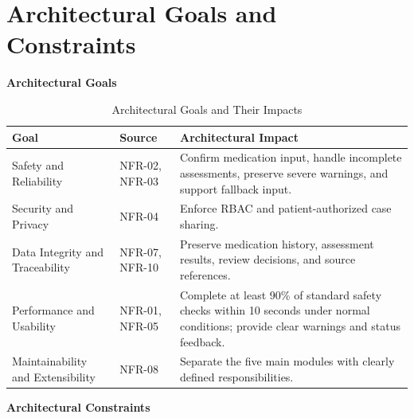 \clearpage
\section{Architectural Goals and Constraints}
\label{sec:architectural-goals}

\medskip
\noindent\textbf{Architectural Goals}

\begin{table}[!htbp]
\centering
\caption{Architectural Goals and Their Impacts}
\label{tab:architectural-goals}

\begin{tabularx}{\textwidth}{|L{3cm}|L{2cm}|Y|}
\hline
\textbf{Goal} & \textbf{Source} &
\textbf{Architectural Impact} \\ \hline

Safety and Reliability & NFR-02, NFR-03 &
Confirm medication input, handle incomplete assessments,
preserve severe warnings, and support fallback input.
\\ \hline

Security and Privacy & NFR-04 &
Enforce RBAC and patient-authorized case sharing.
\\ \hline

Data Integrity and Traceability & NFR-07, NFR-10 &
Preserve medication history, assessment results,
review decisions, and source references.
\\ \hline

Performance and Usability & NFR-01, NFR-05 &
Complete at least 90\% of standard safety checks within
10 seconds under normal conditions; provide clear
warnings and status feedback.
\\ \hline

Maintainability and Extensibility & NFR-08 &
Separate the five main modules with clearly defined
responsibilities.
\\ \hline

\end{tabularx}
\end{table}

\medskip
\noindent\textbf{Architectural Constraints}

